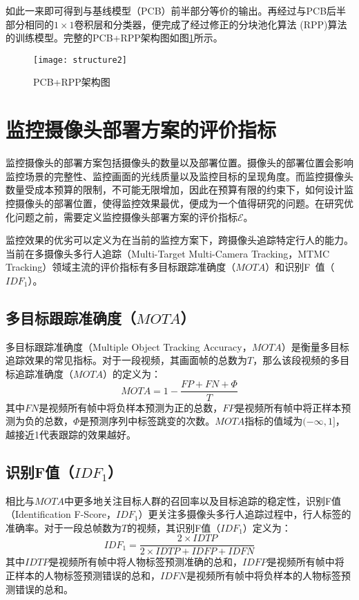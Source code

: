 如此一来即可得到与基线模型（PCB）前半部分等价的输出。再经过与PCB后半部分相同的$1\times1$卷积层和分类器，便完成了经过修正的分块池化算法 (RPP)算法的训练模型。完整的PCB+RPP架构图如图\ref{fig:structure2}所示。

\begin{figure}[!htb]
\centering
\texttt{[image: structure2]}
\caption{PCB+RPP架构图}
\label{fig:structure2}
\end{figure}

\section{监控摄像头部署方案的评价指标}

监控摄像头的部署方案包括摄像头的数量以及部署位置。摄像头的部署位置会影响监控场景的完整性、监控画面的光线质量以及监控目标的呈现角度。而监控摄像头数量受成本预算的限制，不可能无限增加，因此在预算有限的约束下，如何设计监控摄像头的部署位置，使得监控效果最优，便成为一个值得研究的问题。在研究优化问题之前，需要定义监控摄像头部署方案的评价指标$\mathcal{E}$。

监控效果的优劣可以定义为在当前的监控方案下，跨摄像头追踪特定行人的能力。当前在多摄像头多行人追踪（Multi-Target Multi-Camera Tracking，MTMC Tracking）领域主流的评价指标有多目标跟踪准确度（$\mathit{MOTA}$）\cite{ristani2016MTMC}和识别F~值（$\mathit{IDF_1}$）\cite{ristani2016MTMC}。

\subsection{多目标跟踪准确度（$\mathit{MOTA}$）}

多目标跟踪准确度（Multiple Object Tracking Accuracy，$\mathit{MOTA}$）是衡量多目标追踪效果的常见指标。对于一段视频，其画面帧的总数为$T$，那么该段视频的多目标追踪准确度（$\mathit{MOTA}$）的定义为：
\begin{equation}
\label{eq:mota}
\mathit{MOTA}=1-\frac{\mathit{FP}+\mathit{FN}+\Phi}{T}
\end{equation}
其中$\mathit{FN}$是视频所有帧中将负样本预测为正的总数，$\mathit{FP}$是视频所有帧中将正样本预测为负的总数，$\Phi$是预测序列中标签跳变的次数。$\mathit{MOTA}$指标的值域为$(-\infty,1]$，越接近1代表跟踪的效果越好。

\subsection{识别F值（$\mathit{IDF_1}$）}

相比与$\mathit{MOTA}$中更多地关注目标人群的召回率以及目标追踪的稳定性，识别F值（Identification F-Score，$\mathit{IDF_1}$）更关注多摄像头多行人追踪过程中，行人标签的准确率。对于一段总帧数为$T$的视频，其识别F值（$\mathit{IDF_1}$）定义为：
\begin{equation}
\mathit{IDF_1}=\frac{2\times\mathit{IDTP}}{2\times\mathit{IDTP}+\mathit{IDFP}+\mathit{IDFN}}
\end{equation}
其中$\mathit{IDTP}$是视频所有帧中将人物标签预测准确的总和，$\mathit{IDFP}$是视频所有帧中将正样本的人物标签预测错误的总和，$\mathit{IDFN}$是视频所有帧中将负样本的人物标签预测错误的总和。

